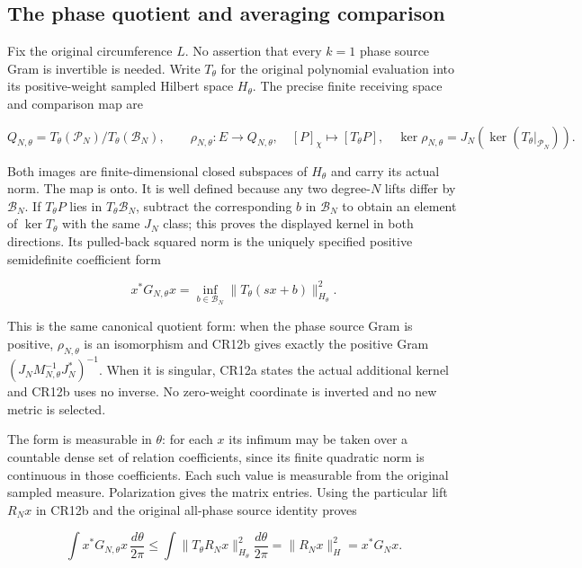 \documentclass{article}
\begin{document}
\subsection{The phase quotient and averaging comparison}\label{the-phase-quotient-and-averaging-comparison}

Fix the original circumference \(L\). No assertion that every \(k=1\) phase source Gram is invertible is needed. Write \(T_\theta\) for the original polynomial evaluation into its positive-weight sampled Hilbert space \(H_\theta\). The precise finite receiving space and comparison map are

\[
Q_{N,\theta}=T_\theta(\mathcal P_N)/T_\theta(\mathcal B_N),\qquad
\rho_{N,\theta}:E\longrightarrow Q_{N,\theta},\quad
[P]_\chi\longmapsto[T_\theta P],\quad
\ker\rho_{N,\theta}=J_N(\ker(T_\theta|_{\mathcal P_N})).
\tag{CR12a}
\]

Both images are finite-dimensional closed subspaces of \(H_\theta\) and carry its actual norm. The map is onto. It is well defined because any two degree-\(N\) lifts differ by \(\mathcal B_N\). If \(T_\theta P\) lies in \(T_\theta\mathcal B_N\), subtract the corresponding \(b\) in \(\mathcal B_N\) to obtain an element of \(\ker T_\theta\) with the same \(J_N\) class; this proves the displayed kernel in both directions. Its pulled-back squared norm is the uniquely specified positive semidefinite coefficient form

\[
x^*G_{N,\theta}x
=\inf_{b\in\mathcal B_N}\|T_\theta(sx+b)\|_{H_\theta}^2.
\tag{CR12b}
\]

This is the same canonical quotient form: when the phase source Gram is positive, \(\rho_{N,\theta}\) is an isomorphism and CR12b gives exactly the positive Gram \((J_NM_{N,\theta}^{-1}J_N^*)^{-1}\). When it is singular, CR12a states the actual additional kernel and CR12b uses no inverse. No zero-weight coordinate is inverted and no new metric is selected.

The form is measurable in \(\theta\): for each \(x\) its infimum may be taken over a countable dense set of relation coefficients, since its finite quadratic norm is continuous in those coefficients. Each such value is measurable from the original sampled measure. Polarization gives the matrix entries. Using the particular lift \(R_Nx\) in CR12b and the original all-phase source identity proves

\[
\int x^*G_{N,\theta}x\,\frac{d\theta}{2\pi}
\le\int\|T_\theta R_Nx\|_{H_\theta}^2\frac{d\theta}{2\pi}
=\|R_Nx\|_H^2=x^*G_Nx.
\tag{CR12c}
\]
\end{document}
